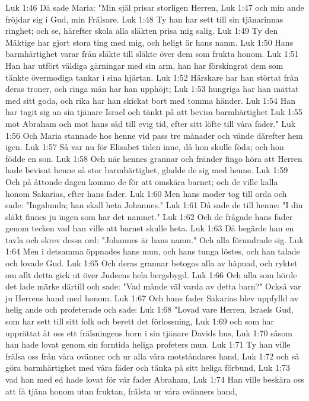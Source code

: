 Luk 1:46  Då sade Maria: "Min själ prisar storligen Herren,
Luk 1:47  och min ande fröjdar sig i Gud, min Frälsare.
Luk 1:48  Ty han har sett till sin tjänarinnas ringhet; och se, härefter skola alla släkten prisa mig salig.
Luk 1:49  Ty den Mäktige har gjort stora ting med mig, och heligt är hans namn.
Luk 1:50  Hans barmhärtighet varar från släkte till släkte över dem som frukta honom.
Luk 1:51  Han har utfört väldiga gärningar med sin arm, han har förskingrat dem som tänkte övermodiga tankar i sina hjärtan.
Luk 1:52  Härskare har han störtat från deras troner, och ringa män har han upphöjt;
Luk 1:53  hungriga har han mättat med sitt goda, och rika har han skickat bort med tomma händer.
Luk 1:54  Han har tagit sig an sin tjänare Israel och tänkt på att bevisa barmhärtighet
Luk 1:55  mot Abraham och mot hans säd till evig tid, efter sitt löfte till våra fäder."
Luk 1:56  Och Maria stannade hos henne vid pass tre månader och vände därefter hem igen.
Luk 1:57  Så var nu för Elisabet tiden inne, då hon skulle föda; och hon födde en son.
Luk 1:58  Och när hennes grannar och fränder fingo höra att Herren hade bevisat henne så stor barmhärtighet, gladde de sig med henne.
Luk 1:59  Och på åttonde dagen kommo de för att omskära barnet; och de ville kalla honom Sakarias, efter hans fader.
Luk 1:60  Men hans moder tog till orda och sade: "Ingalunda; han skall heta Johannes."
Luk 1:61  Då sade de till henne: "I din släkt finnes ju ingen som har det namnet."
Luk 1:62  Och de frågade hans fader genom tecken vad han ville att barnet skulle heta.
Luk 1:63  Då begärde han en tavla och skrev dessa ord: "Johannes är hans namn." Och alla förundrade sig.
Luk 1:64  Men i detsamma öppnades hans mun, och hans tunga löstes, och han talade och lovade Gud.
Luk 1:65  Och deras grannar betogos alla av häpnad, och ryktet om allt detta gick ut över Judeens hela bergsbygd.
Luk 1:66  Och alla som hörde det lade märke därtill och sade: "Vad månde väl varda av detta barn?" Också var ju Herrens hand med honom.
Luk 1:67  Och hans fader Sakarias blev uppfylld av helig ande och profeterade och sade:
Luk 1:68  "Lovad vare Herren, Israels Gud, som har sett till sitt folk och berett det förlossning,
Luk 1:69  och som har upprättat åt oss ett frälsningens horn i sin tjänare Davids hus,
Luk 1:70  såsom han hade lovat genom sin forntida heliga profeters mun.
Luk 1:71  Ty han ville frälsa oss från våra ovänner och ur alla våra motståndares hand,
Luk 1:72  och så göra barmhärtighet med våra fäder och tänka på sitt heliga förbund,
Luk 1:73  vad han med ed hade lovat för vår fader Abraham,
Luk 1:74  Han ville beskära oss att få tjäna honom utan fruktan, frälsta ur våra ovänners hand,
